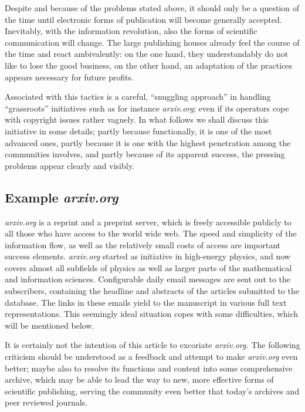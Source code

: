 Despite and because of the problems stated above, it should only be a
question of the time until electronic forms of publication will become
generally accepted.  Inevitably, with the  information revolution,  also the forms of scientific
communication will change.
The large publishing houses already
feel the course of the time and react ambivalently:  on the one hand,
they understandably do not like to lose the good business, on the other
hand, an adaptation of the practices appears necessary for future
profits.

Associated with this tactics is a careful, ``snuggling approach'' in
handling ``grassroots'' initiatives such as for instance {\it
arxiv.org}; even if its operators cope with copyright issues rather
vaguely.  In what follows we shall discuss this initiative in some
details; partly because functionally, it is one of the most advanced
ones, partly because it is one with the highest penetration among the
communities involves, and partly because of its apparent success, the
pressing problems appear clearly and visibly.


\subsection{Example {\it arxiv.org}}

{\it arxiv.org} is a reprint and a preprint server, which is freely
accessible publicly to all those who have access to the world wide web.
The speed and simplicity of the information flow, as well as the
relatively small costs of access are important success elements.  {\it
arxiv.org} started as initiative in high-energy physics, and now covers
almost all subfields of physics as well as larger parts of the
mathematical and information sciences.  Configurable daily email
messages are sent out to the subscribers, containing the headline and
abstracts of the articles submitted to the database.  The links in these
emails yield to the manuscript in various full text representations.
This seemingly ideal situation copes with some difficulties, which will
be mentioned below.

It is certainly not the intention of this article to excoriate {\it arxiv.org.} The following
criticism should be understood as a feedback and attempt to make {\it
arxiv.org} even better; maybe also to resolve its functions and content into some
comprehensive archive, which may be able to lead the way to new, more
effective forms of scientific publishing, serving the community even
better that today's archives and peer reviewed journals.

